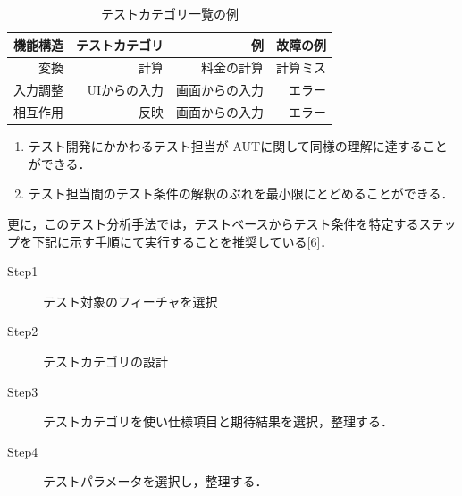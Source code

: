 \documentclass[a4paper,12pt]{jreport}
\begin{document}
\begin{table}[t]
\caption{テストカテゴリ一覧の例}
\label{tbl:D-3-tbl1}
\begin{center}
\begin{tabular}{r|r|r|r}
機能構造&テストカテゴリ&例&故障の例\\
\hline
\hline
変換&計算&料金の計算&計算ミス\\
\hline
入力調整&UIからの入力&画面からの入力&エラー\\
\hline
相互作用&反映&画面からの入力&エラー\\
    \hline
\end{tabular}%
\end{center}
\end{table}




\begin{enumerate}
\item テスト開発にかかわるテスト担当が AUTに関して同様の理解に達することができる．
\item テスト担当間のテスト条件の解釈のぶれを最小限にとどめることができる．
\end{enumerate}
更に，このテスト分析手法では，テストベースからテスト条件を特定するステップを下記に示す手順にて実行することを推奨している[6]．

\begin{description}
\item[Step1] テスト対象のフィーチャを選択
\item[Step2] テストカテゴリの設計
\item[Step3] テストカテゴリを使い仕様項目と期待結果を選択，整理する．
\item[Step4] テストパラメータを選択し，整理する．
\end{description}
\end{document}
